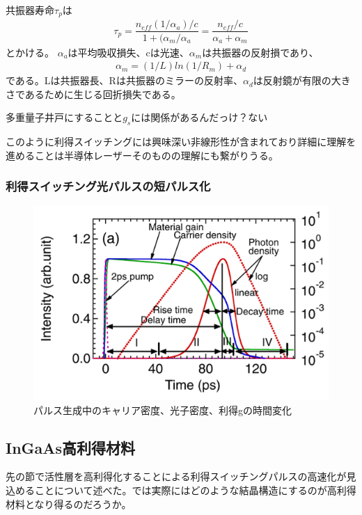 共振器寿命$\tau_{p}$は
\begin{eqnarray}
\tau_{p}=\dfrac{n_{eff}(1/\alpha_{a})/c}{1+(\alpha_{m}/\alpha_{a}}=\dfrac{n_{eff}/c}{\alpha_{a}+\alpha_{m}}
\end{eqnarray}
とかける\cite{ref_iga}。
$\alpha_{a}$は平均吸収損失、cは光速、$\alpha_{m}$は共振器の反射損であり、
\begin{eqnarray*}
\alpha_{m}=(1/L)ln(1/R_{m})+\alpha_{d}
\end{eqnarray*}
である。Lは共振器長、Rは共振器のミラーの反射率、$\alpha_{d}$は反射鏡が有限の大きさであるために生じる回折損失である。


多重量子井戸にすることと$g_{s}$には関係があるんだっけ？ない


このように利得スイッチングには興味深い非線形性が含まれており詳細に理解を進めることは半導体レーザーそのものの理解にも繋がりうる。

\clearpage
\subsubsection{利得スイッチング光パルスの短パルス化}


\begin{figure}[h]
	\centering
	\includegraphics[width=15cm]{figure/fig_1_1_GS_pulse.png}
	\caption{パルス生成中のキャリア密度、光子密度、利得gの時間変化\cite{ref_1_1_GS}}
	\label{fig:fig_1_1_GS_pulse}
\end{figure}

\clearpage
\subsection{InGaAs高利得材料}
先の節で活性層を高利得化することによる利得スイッチングパルスの高速化が見込めることについて述べた。では実際にはどのような結晶構造にするのが高利得材料となり得るのだろうか。

